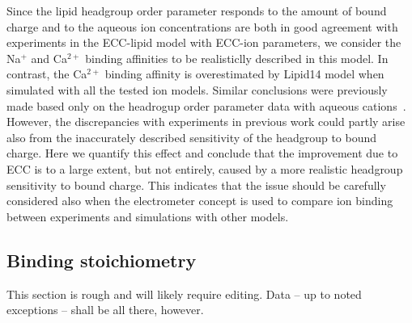 \documentclass[aip,jcp,twocolumn]{revtex4}
\begin{document}
Since the lipid headgroup order parameter responds to the amount of bound charge
and to the aqueous ion concentrations are both in good agreement with experiments
in the ECC-lipid model with ECC-ion parameters, we consider the Na$^+$ and Ca$^{2+}$
binding affinities to be realisticlly described in this model. In contrast, the Ca$^{2+}$
binding affinity is overestimated by Lipid14 model when simulated with all the
tested ion models. Similar conclusions were previously made based only on the headrogup
order parameter data with aqueous cations~\cite{catte16}. However,
the discrepancies with experiments in previous work could partly arise also from
the inaccurately described sensitivity of the headgroup to bound charge. Here we quantify this
effect and conclude that the improvement due to ECC is to a large extent, but not entirely,
caused by a more realistic headgroup sensitivity to bound charge.
This indicates that the issue should be carefully considered also when
the electrometer concept is used to compare ion binding between experiments
and simulations with other models.





\subsection{Binding stoichiometry}


This section is rough and will likely require editing. 
Data -- up to noted exceptions -- shall be all there, however. 
\end{document}
